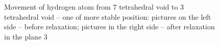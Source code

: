 \begin{figure}[h!]
\begin{minipage}[h]{0.5\linewidth}
\end{minipage}
\hfill
\begin{minipage}[h]{0.5\linewidth}
\end{minipage}
\caption{Movement of hydrogen atom from 7 tetrahedral void to 3 tetrahedral void -- one of more stable position: pictures on the left side -- before relaxation; pictures in the right side -- after relaxation in the plane 3}
\label{7to3}
\end{figure}

